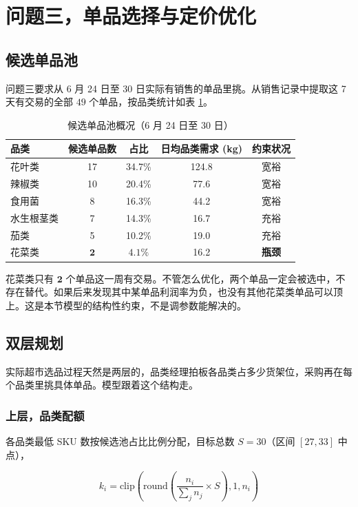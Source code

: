 \section{问题三，单品选择与定价优化}

\subsection{候选单品池}

问题三要求从 6 月 24 日至 30 日实际有销售的单品里挑。从销售记录中提取这 7 天有交易的全部 $49$ 个单品，按品类统计如表 \ref{tab:q3_candidates}。

\begin{table}[H]
\centering
\caption{候选单品池概况（6 月 24 日至 30 日）}
\label{tab:q3_candidates}
\begin{tabular}{lcccc}
\hline
品类 & 候选单品数 & 占比 & 日均品类需求 (kg) & 约束状况 \\
\hline
花叶类 & 17 & 34.7\% & 124.8 & 宽裕 \\
辣椒类 & 10 & 20.4\% & 77.6 & 宽裕 \\
食用菌 & 8 & 16.3\% & 44.2 & 宽裕 \\
水生根茎类 & 7 & 14.3\% & 16.7 & 充裕 \\
茄类 & 5 & 10.2\% & 19.0 & 充裕 \\
花菜类 & $\mathbf{2}$ & $\mathbf{4.1\%}$ & 16.2 & \textbf{瓶颈} \\
\hline
\end{tabular}
\end{table}

花菜类只有 $\mathbf{2}$ 个单品这一周有交易。不管怎么优化，两个单品一定会被选中，不存在替代。如果后来发现其中某单品利润率为负，也没有其他花菜类单品可以顶上。这是本节模型的结构性约束，不是调参数能解决的。

\subsection{双层规划}

实际超市选品过程天然是两层的，品类经理拍板各品类占多少货架位，采购再在每个品类里挑具体单品。模型跟着这个结构走。

\subsubsection{上层，品类配额}

各品类最低 SKU 数按候选池占比比例分配，目标总数 $S=30$（区间 $[27,33]$ 中点），

\begin{equation}
k_i = \text{clip}\left( \text{round}\left( \frac{n_i}{\sum_j n_j} \times S \right), 1, n_i \right)
\end{equation}

